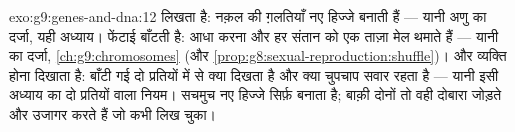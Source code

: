 \begin{solution}{exo:g9:genes-and-dna:12}
 लिखता है: नक़ल की ग़लतियाँ नए हिज्जे बनाती हैं --- यानी अणु
का दर्जा, यही अध्याय। फेंटाई बाँटती है: आधा करना और  हर संतान को एक
ताज़ा मेल थमाते हैं --- यानी  का दर्जा,
\cref{ch:g9:chromosomes} (और
\cref{prop:g8:sexual-reproduction:shuffle})। और व्यक्ति होना दिखाता है:
बाँटी गई दो प्रतियों में से क्या दिखता है और क्या चुपचाप सवार रहता है ---
यानी इसी अध्याय का दो प्रतियों वाला नियम। सचमुच नए हिज्जे सिर्फ़
 बनाता है; बाक़ी दोनों तो वही दोबारा जोड़ते और उजागर करते हैं
जो  कभी लिख चुका।
\end{solution}

